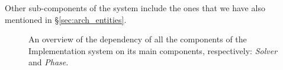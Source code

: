 Other sub-components of the system include the ones that we have also mentioned in \S\ref{sec:arch_entities}. 
\begin{figure}
    \centering
    \hfill
    \centering
    \caption{An overview of the dependency of all the components of the Implementation system on its main components, respectively: \textit{Solver} and \textit{Phase}.}
    \label{fig:impl_sys_dep}
\end{figure}
